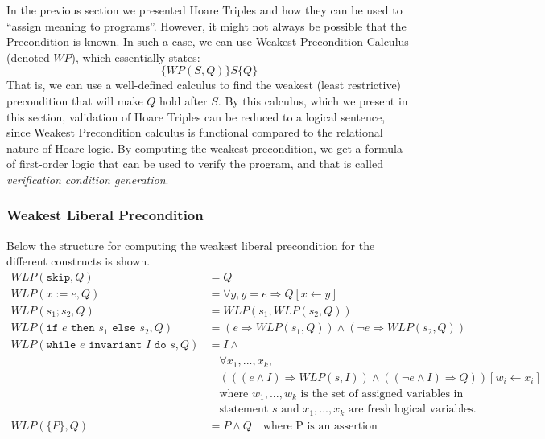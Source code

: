 

In the previous section we presented Hoare Triples and how they can be used to ``assign meaning to programs''. However, it might not always be possible that the Precondition is known. In such a case, we can use Weakest Precondition Calculus (denoted $WP$), which essentially states:
$$
 \{WP(S,Q)\}S\{Q\}
$$
That is, we can use a well-defined calculus to find the weakest (least restrictive) precondition that will make $Q$ hold after $S$. By this calculus, which we present in this section, validation of Hoare Triples can be reduced to a logical sentence, since Weakest Precondition calculus is functional compared to the relational nature of Hoare logic.
By computing the weakest precondition, we get a formula of first-order logic that can be used to verify the program, and that is called \textit{verification condition generation}.

\subsubsection{Weakest Liberal Precondition}
Below the structure for computing the weakest liberal precondition for the different constructs is shown.
\begin{align*}
	WLP(\texttt{skip}, Q) &= Q \\
	WLP(x:=e,Q) &= \forall y, y = e \Rightarrow Q[x \leftarrow y] \\
	WLP(s_1;s_2, Q) &= WLP(s_1, WLP(s_2, Q)) \\
	WLP(\texttt{if } e \texttt{ then } s_1 \texttt{ else } s_2, Q) &= (e \Rightarrow WLP(s_1, Q)) \land (\neg e \Rightarrow WLP(s_2, Q)) \\
	WLP(\texttt{while } e \texttt{ invariant } I \texttt{ do } s, Q) &= 
		I \land \\
    &\quad \forall x_1, ..., x_k, \\
    &\quad (((e \land I) \Rightarrow WLP(s, I)) \land (( \neg e \land I) \Rightarrow Q))
       [w_i \leftarrow x_i] \\
	&\quad \text{where } w_1, ..., w_k \text{ is the set of assigned variables in} \\
  &\quad \text{statement } s \text{ and } x_1, ..., x_k \text{ are fresh logical variables.} \\
  WLP(\{P\}, Q) &= P \land Q \quad \text{where P is an assertion}
\end{align*}


